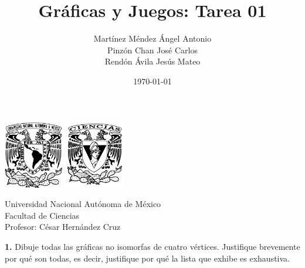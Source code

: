 \documentclass[12pt]{article}
\title{\textbf{Gráficas y Juegos: Tarea 01}}
\author{Martínez Méndez Ángel Antonio\\Pinzón Chan José Carlos\\Rendón Ávila Jesús Mateo}
\date{\today}
\begin{document}
\maketitle
\begin{center}
\vspace{3cm}
\includegraphics[width=0.195\textwidth]{Escudo.png}
\hspace{0.5cm}
\includegraphics[width=0.2\textwidth]{logo_ciencias.png}
\end{center}
\begin{center}
    \vspace{1cm}
    Universidad Nacional Autónoma de México\\
    Facultad de Ciencias\\
    Profesor: César Hernández Cruz\\
\end{center}

\newpage

\textbf{1.} Dibuje todas las gráficas no isomorfas de cuatro vértices. Justifique brevemente por qué son
todas, es decir, justifique por qué la lista que exhibe es exhaustiva.

\vspace{1cm}
\end{document}
